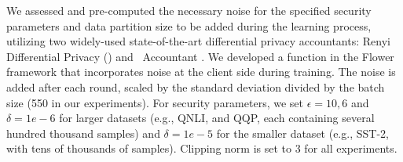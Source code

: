We assessed and pre-computed the necessary noise for the specified security parameters and data partition size to be added during the learning process, utilizing two widely-used state-of-the-art differential privacy accountants: Renyi Differential Privacy (\rdp) \cite{abadi2016deep,mironov2017renyi} and \sys~Accountant \cite{birrell2024differentially}. 
We developed a function in the Flower framework that incorporates noise at the client side during training. The noise is added after each round, scaled by the standard deviation divided by the batch size (550 in our experiments).
For security parameters, we set \( \epsilon = 10,6 \) and \( \delta = 1e-6 \) for larger datasets (e.g., QNLI, and QQP, each containing several hundred thousand samples) and \( \delta = 1e-5 \) for the smaller dataset (e.g., SST-2, with tens of thousands of samples). Clipping norm is set to 3 for all experiments.
